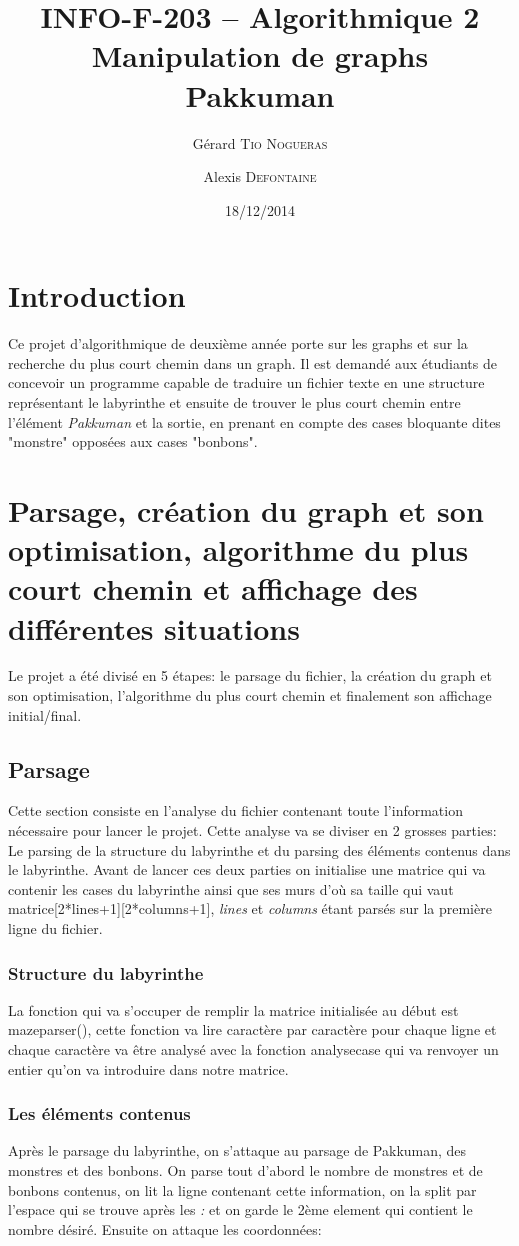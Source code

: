 \documentclass[12pt, oneside]{article}
\title{{\normalsize{INFO-F-203 -- Algorithmique 2}}\\Manipulation de graphs\\ Pakkuman}
\author{Gérard \textsc{Tio Nogueras} \and Alexis \textsc{Defontaine}}
\date{18/12/2014}
\begin{document}
\maketitle

\section{Introduction}
Ce projet d'algorithmique de deuxième année porte sur les graphs et sur la recherche du plus court chemin dans un graph.
Il est demandé aux étudiants de concevoir un programme capable de traduire un fichier texte en une structure représentant le labyrinthe et ensuite de trouver le plus court chemin entre l'élément \emph{Pakkuman} et la sortie, en prenant en compte des cases bloquante dites "monstre" opposées aux cases "bonbons".
\section{Parsage, création du graph et son optimisation, algorithme du plus court chemin et affichage des différentes situations}
Le projet a été divisé en 5 étapes: le parsage du fichier, la création du graph et son optimisation, l'algorithme du plus court chemin et finalement son affichage initial/final.
\subsection{Parsage}
Cette section consiste en l'analyse du fichier contenant toute l'information nécessaire pour lancer le projet. Cette analyse va se diviser en 2 grosses parties: Le parsing de la structure du labyrinthe et du parsing des éléments contenus dans le labyrinthe. Avant de lancer ces deux parties on initialise une matrice qui va contenir les cases du labyrinthe  ainsi que ses murs d'où sa taille qui vaut matrice[2*lines+1][2*columns+1], \emph{lines} et \emph{columns} étant parsés sur la première ligne du fichier. 
 
\subsubsection{Structure du labyrinthe}
La fonction qui va s'occuper de remplir la matrice initialisée au début est maze\textunderscore parser(), cette fonction va lire caractère par caractère pour chaque ligne et chaque caractère va être analysé avec la fonction analyse\textunderscore case qui va renvoyer un entier qu'on va introduire dans notre matrice.

\subsubsection{Les éléments contenus}
Après le parsage du labyrinthe, on s'attaque au parsage de Pakkuman, des monstres et des bonbons.
On parse tout d'abord le nombre de monstres et de bonbons contenus, on lit la ligne contenant cette information, on la split par l'espace qui se trouve après les \emph{:} et on garde le 2ème element qui contient le nombre désiré.
Ensuite on attaque les coordonnées:
\end{document}
